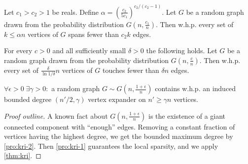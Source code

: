 \begin{proposition}
    \label{pro:kri-1}
    Let $c_1>c_2>1$ be reals. Define $\alpha=\left(\frac{c_2}{5c_1}\right)^{c_2/(c_2-1)}$.
    Let $G$ be a random graph drawn from the probability distribution $G\left(n,\frac{c_1}{n}\right)$.
    Then w.h.p. every set of $k\leq\alpha n$ vertices of $G$ spans fewer than $c_2k$ edges.
\end{proposition}

\begin{proposition}
    \label{pro:kri-2}
    For every $c>0$ and all sufficiently small $\delta>0$ the following holds.
    Let $G$ be a random graph drawn from the probability distribution $G\left(n,\frac{c}{n}\right)$.
    Then w.h.p. every set of $\frac{\delta}{\ln 1/\delta}n$ vertices of $G$ touches fewer than $\delta n$ edges.
\end{proposition}

\begin{theorem}
    \label{thm:kri-gnp}
    $\forall\epsilon>0\;\exists\gamma>0:$ a random graph $G\sim G\left(n,\frac{1+\epsilon}{n}\right)$
    contains w.h.p. an induced bounded degree $(n'/2,\gamma)$ vertex expander
    on $n'\geq\gamma n$ vertices.
\end{theorem}

\begin{proof}[Proof outline]
    A known fact about $G\left(n,\frac{1+\epsilon}{n}\right)$ is the existence of a giant connected component with ``enough'' edges.
    Removing a constant fraction of vertices having the highest degree, we get the bounded maximum degree by \autoref{pro:kri-2}.
    Then \autoref{pro:kri-1} guarantees the local sparsity, and we apply \autoref{thm:kri}.
\end{proof}
